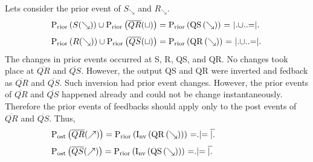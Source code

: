 \documentclass[10pt,journal]{IEEEtran}
\begin{document}
Lets consider the prior event of $S_{\searrow}$ and $R_{\searrow}$. 
\begin{equation}
 \begin{minipage}{250pt}
\begin{flushleft} $\displaystyle \operatorname{P_{rior}}{\left(S{\left(\searrow \right)} \right)} \cup \operatorname{P_{rior}}{\left(\overline{QR}{\left(\sqcup \right)} \right)} = \operatorname{P_{rior}}{\left(\operatorname{QS}{\left(\searrow \right)} \right)}$   = $|.$$\cup$$..$=$|.$\end{flushleft}
 \end{minipage}
 \end{equation}
\begin{equation}
 \begin{minipage}{250pt}
\begin{flushleft} $\displaystyle \operatorname{P_{rior}}{\left(R{\left(\searrow \right)} \right)} \cup \operatorname{P_{rior}}{\left(\overline{QS}{\left(\sqcup \right)} \right)} = \operatorname{P_{rior}}{\left(\operatorname{QR}{\left(\searrow \right)} \right)}$   = $|.$$\cup$$..$=$|.$\end{flushleft}
 \end{minipage}
 \end{equation}
The changes in prior events occurred at S, R, QS, and  QR. No changes     took place at $\overline{QR}$ and $\overline{QS}$.  However, the output     QS and QR were inverted and fedback as $\overline{QR}$ and $\overline{QS}$.    Such inversion had prior event changes. However, the prior events of      $\overline{QR}$ and $\overline{QS}$ happened already and could not be     change instantaneously. Therefore the prior events of feedbacks     should apply only to the post events of $\overline{QR}$ and     $\overline{QS}$. Thus,
\begin{equation}
 \begin{minipage}{250pt}
\begin{flushleft} $\displaystyle \operatorname{P_{ost}}{\left(\overline{QR}{\left(\nearrow \right)} \right)} = \operatorname{P_{rior}}{\left(\operatorname{I_{nv}}{\left(\operatorname{QR}{\left(\searrow \right)} \right)} \right)}$  =$.|$$= \overline{|.}$\end{flushleft}
 \end{minipage}
 \end{equation}
\begin{equation}
 \begin{minipage}{250pt}
\begin{flushleft} $\displaystyle \operatorname{P_{ost}}{\left(\overline{QS}{\left(\nearrow \right)} \right)} = \operatorname{P_{rior}}{\left(\operatorname{I_{nv}}{\left(\operatorname{QS}{\left(\searrow \right)} \right)} \right)}$  =$.|$$= \overline{|.}$\end{flushleft}
 \end{minipage}
 \end{equation}
\end{document}
